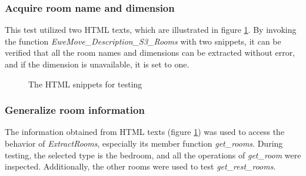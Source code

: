 \documentclass[12pt,twoside]{report}
\begin{document}
\subsubsection{Acquire room name and dimension}
This test utilized two HTML texts, which are illustrated in figure \ref{html_room_info_test}. By invoking the function \textit{EweMove\_Description\_S3\_Rooms} with two snippets, it can be verified that all the room names and dimensions can be extracted without error, and if the dimension is unavailable, it is set to one. 

\begin{figure}[h]
	\centering
	\hfill
	\caption{The HTML snippets for testing}
	\label{html_room_info_test}
\end{figure}

\subsubsection{Generalize room information}
The information obtained from HTML texts (figure \ref{html_room_info_test}) was used to access the behavior of \textit{ExtractRooms}, especially its member function \textit{get\_rooms}. During testing, the selected type is the bedroom, and all the operations of \textit{get\_room} were inspected. Additionally, the other rooms were used to test \textit{get\_rest\_rooms}. 
\\
\end{document}
